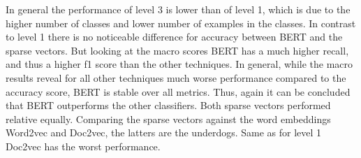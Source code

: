 \documentclass[12pt, a4paper, titlepage]{article}
\begin{document}
\begin{table}[hb!]
\caption{\label{tab: T10} Evaluation of Level 3 classification - macro}
\end{table}

In general the performance of level 3 is lower than of level 1, which is due to the higher number of classes and lower number of examples in the classes. In contrast to level 1 there is no noticeable difference for accuracy between \ac{BERT} and the sparse vectors. But looking at the macro scores \ac{BERT} has a much higher recall, and thus a higher f1 score than the other techniques. In general, while the macro results reveal for all other techniques much worse performance compared to the accuracy score, \ac{BERT} is stable over all metrics. Thus, again it can be concluded that \ac{BERT} outperforms the other classifiers. Both sparse vectors performed relative equally. Comparing the sparse vectors against the word embeddings Word2vec and Doc2vec, the latters are the underdogs. Same as for level 1 Doc2vec has the worst performance. 
\end{document}
